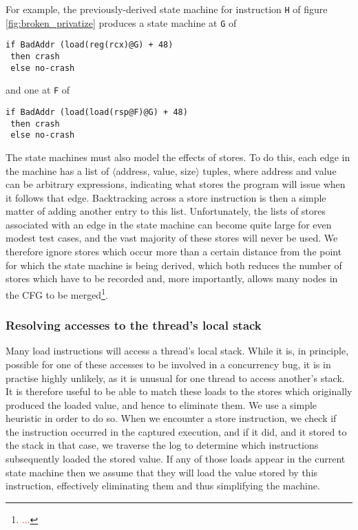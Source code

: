 \documentclass[10pt,twocolumn,preprint,natbib,authoryear]{sigplanconf}
\newcommand{\editorial}[1]{\textcolor{red}{\footnote{\textcolor{red}{#1}}}}
\begin{document}
For example, the previously-derived state machine for instruction
\verb|H| of figure \ref{fig:broken_privatize} produces a state machine
at \verb|G| of

\begin{verbatim}
if BadAddr (load(reg(rcx)@G) + 48)
 then crash
 else no-crash
\end{verbatim}

and one at \verb|F| of

\begin{verbatim}
if BadAddr (load(load(rsp@F)@G) + 48)
 then crash
 else no-crash
\end{verbatim}

The state machines must also model the effects of stores.  To do this,
each edge in the machine has a list of $\langle{}$address, value,
size$\rangle{}$ tuples, where address and value can be arbitrary
expressions, indicating what stores the program will issue when it
follows that edge.  Backtracking across a store instruction is then a
simple matter of adding another entry to this list.  Unfortunately,
the lists of stores associated with an edge in the state machine can
become quite large for even modest test cases, and the vast majority
of these stores will never be used.  We therefore ignore stores which
occur more than a certain distance from the point for which the state
machine is being derived, which both reduces the number of stores
which have to be recorded and, more importantly, allows many nodes in
the CFG to be merged\editorial{...}.

\subsubsection{Resolving accesses to the thread's local stack}
\label{sect:resolvestack}

Many load instructions will access a thread's local stack.  While it
is, in principle, possible for one of these accesses to be involved in
a concurrency bug, it is in practise highly unlikely, as it is unusual
for one thread to access another's stack.  It is therefore useful to
be able to match these loads to the stores which originally produced
the loaded value, and hence to eliminate them.  We use a simple
heuristic in order to do so.  When we encounter a store instruction,
we check if the instruction occurred in the captured execution, and if
it did, and it stored to the stack in that case, we traverse the log
to determine which instructions subsequently loaded the stored value.
If any of those loads appear in the current state machine then we
assume that they will load the value stored by this instruction,
effectively eliminating them and thus simplifying the machine.
\end{document}
